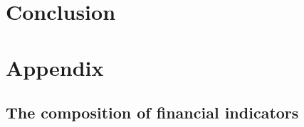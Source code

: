 \documentclass[a4paper,11pt]{article}
\begin{document}
\section{Conclusion}
\label{sec:conclusion}

\clearpage
%


%
\clearpage
%
\section{Appendix}
\label{sec:appch2}
\renewcommand{\thesection}{A\arabic{section}}%
\renewcommand{\thetable}{A\arabic{table}}%
\renewcommand{\thefigure}{A\arabic{figure}}%
\renewcommand{\theequation}{A\arabic{eq}} 

\subsection*{The composition of financial indicators}
\label{subsec:finind_comp}
\end{document}
